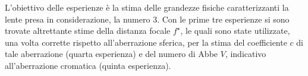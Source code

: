 L'obiettivo delle esperienze \`e la stima delle grandezze fisiche 
caratterizzanti la lente presa in considerazione, la numero 3. Con 
le prime tre esperienze si sono trovate altrettante stime della 
distanza focale $f^{\star}$, le quali sono state utilizzate, una volta 
corrette rispetto all'aberrazione sferica, per la stima del 
coefficiente $c$ di tale aberrazione (quarta esperienza) e del 
numero di Abbe $V$, indicativo all'aberrazione cromatica (quinta 
esperienza).
